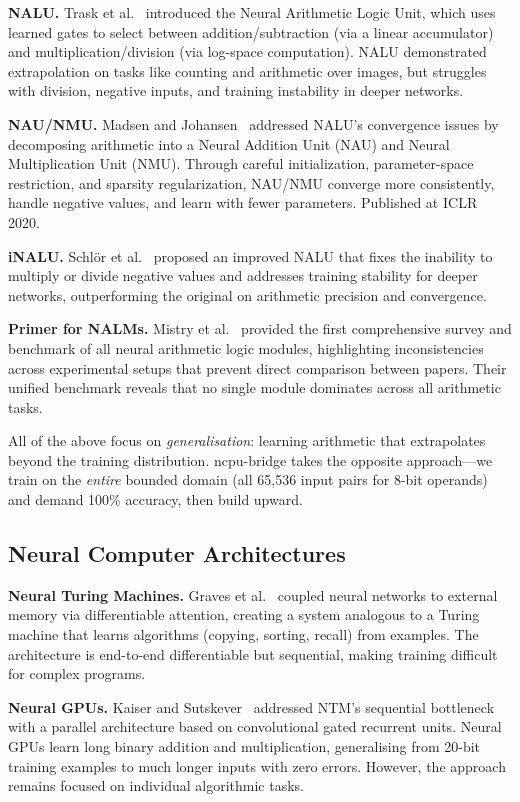 \documentclass[11pt,a4paper]{article}
\begin{document}
\textbf{NALU.} Trask et al.~\cite{trask2018nalu} introduced the Neural Arithmetic Logic Unit, which uses learned gates to select between addition/subtraction (via a linear accumulator) and multiplication/division (via log-space computation). NALU demonstrated extrapolation on tasks like counting and arithmetic over images, but struggles with division, negative inputs, and training instability in deeper networks.

\textbf{NAU/NMU.} Madsen and Johansen~\cite{madsen2020nau} addressed NALU's convergence issues by decomposing arithmetic into a Neural Addition Unit (NAU) and Neural Multiplication Unit (NMU). Through careful initialization, parameter-space restriction, and sparsity regularization, NAU/NMU converge more consistently, handle negative values, and learn with fewer parameters. Published at ICLR 2020.

\textbf{iNALU.} Schl\"or et al.~\cite{schlor2020inalu} proposed an improved NALU that fixes the inability to multiply or divide negative values and addresses training stability for deeper networks, outperforming the original on arithmetic precision and convergence.

\textbf{Primer for NALMs.} Mistry et al.~\cite{mistry2022primer} provided the first comprehensive survey and benchmark of all neural arithmetic logic modules, highlighting inconsistencies across experimental setups that prevent direct comparison between papers. Their unified benchmark reveals that no single module dominates across all arithmetic tasks.

All of the above focus on \emph{generalisation}: learning arithmetic that extrapolates beyond the training distribution. ncpu-bridge takes the opposite approach---we train on the \emph{entire} bounded domain (all 65,536 input pairs for 8-bit operands) and demand 100\% accuracy, then build upward.

\subsection{Neural Computer Architectures}

\textbf{Neural Turing Machines.} Graves et al.~\cite{graves2014ntm} coupled neural networks to external memory via differentiable attention, creating a system analogous to a Turing machine that learns algorithms (copying, sorting, recall) from examples. The architecture is end-to-end differentiable but sequential, making training difficult for complex programs.

\textbf{Neural GPUs.} Kaiser and Sutskever~\cite{kaiser2015neuralgpu} addressed NTM's sequential bottleneck with a parallel architecture based on convolutional gated recurrent units. Neural GPUs learn long binary addition and multiplication, generalising from 20-bit training examples to much longer inputs with zero errors. However, the approach remains focused on individual algorithmic tasks.
\end{document}

